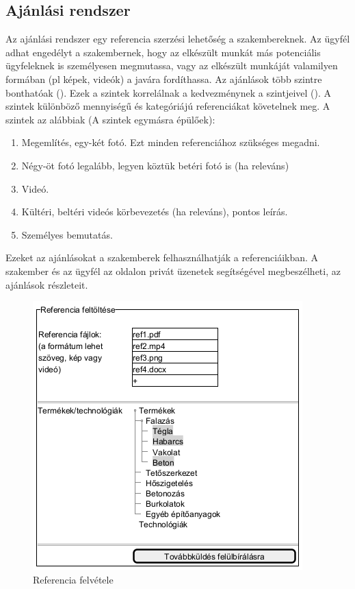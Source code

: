 \subsection{Ajánlási rendszer}
Az ajánlási rendszer egy referencia szerzési lehetőség a szakembereknek. Az ügyfél adhat engedélyt a szakembernek, hogy az elkészült munkát más potenciális ügyfeleknek is személyesen megmutassa, vagy az elkészült munkáját valamilyen formában (pl képek, videók) a javára fordíthassa. Az ajánlások több szintre bonthatóak (). Ezek a szintek korrelálnak a kedvezménynek a szintjeivel (). A szintek különböző mennyiségű és kategóriájú referenciákat követelnek meg. A szintek az alábbiak (A szintek egymásra épülőek):
\begin{enumerate}
  \item Megemlítés, egy-két fotó. Ezt minden referenciához szükséges megadni.
  \item Négy-öt fotó legalább, legyen köztük betéri fotó is (ha releváns)
  \item Videó.
  \item Kültéri, beltéri videós körbevezetés (ha releváns), pontos leírás.
  \item Személyes bemutatás.
\end{enumerate}
Ezeket az ajánlásokat a szakemberek felhasználhatják a referenciáikban. A szakember és az ügyfél az oldalon privát üzenetek segítségével megbeszélheti, az ajánlások részleteit.

\begin{figure}[h]
	\centering
	\includegraphics[scale=0.5]{img/referenciak.png}
	\caption*{Referencia felvétele}
	\label{fig:ref}
\end{figure}